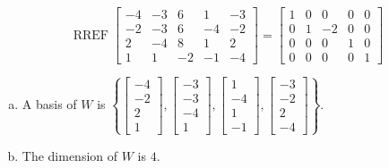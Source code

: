 \begin{exerciseAnswer} 


\[\operatorname{RREF} \left[\begin{array}{ccccc}
-4 & -3 & 6 & 1 & -3 \\
-2 & -3 & 6 & -4 & -2 \\
2 & -4 & 8 & 1 & 2 \\
1 & 1 & -2 & -1 & -4
\end{array}\right] = \left[\begin{array}{ccccc}
1 & 0 & 0 & 0 & 0 \\
0 & 1 & -2 & 0 & 0 \\
0 & 0 & 0 & 1 & 0 \\
0 & 0 & 0 & 0 & 1
\end{array}\right] \]


\begin{enumerate}[(a)]
\item A basis of \(W\) is \( \left\{ \left[\begin{array}{c}
-4 \\
-2 \\
2 \\
1
\end{array}\right] , \left[\begin{array}{c}
-3 \\
-3 \\
-4 \\
1
\end{array}\right] , \left[\begin{array}{c}
1 \\
-4 \\
1 \\
-1
\end{array}\right] , \left[\begin{array}{c}
-3 \\
-2 \\
2 \\
-4
\end{array}\right] \right\} \).
\item The dimension of \(W\) is \( 4 \).
\end{enumerate}
    
\end{exerciseAnswer}
    
